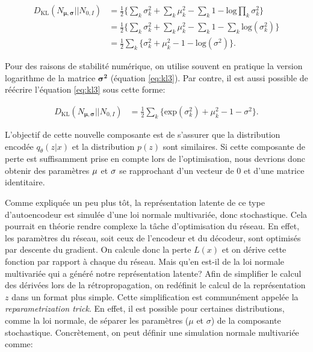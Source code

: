 \begin{equation}  \label{eq:kl3}
\begin{aligned}
D_{\text{KL}}(N_{\boldsymbol \mu, \boldsymbol \sigma} || N_{0,I}) &=  \frac{1}{2}\Big\{\sum_k \sigma_{k}^2+ \sum_{k}\mu_{k}^2 - \sum_{k} 1 - \text{log} \prod_{k}\sigma_{k}^2\Big \} \\
&=\frac{1}{2}\Big\{\sum_k \sigma_{k}^2+ \sum_{k}\mu_{k}^2 - \sum_{k} 1 - \sum_{k} \text{log} (\sigma_{k}^2)\Big \} \\
&=\frac{1}{2} \sum_{k}\Big\{\sigma_{k}^2 + \mu_{k}^2 - 1 - \text{log}(\sigma^2)\Big\}.
\end{aligned}
\end{equation}

Pour des raisons de stabilité numérique, on utilise souvent en pratique la version logarithme de la matrice $\boldsymbol{\sigma^2}$ (équation \ref{eq:kl3}). Par contre, il est aussi possible de réécrire l'équation \ref{eq:kl3} sous cette forme:

\begin{equation}  \label{eq:kl4}
\begin{aligned}
D_{\text{KL}}(N_{\boldsymbol \mu, \boldsymbol \sigma} || N_{0,I}) &= \frac{1}{2} \sum_{k}\Big\{\text{exp}(\sigma_{k}^2) + \mu_{k}^2 - 1 - \sigma^2\Big\}.
\end{aligned}
\end{equation}


 L'objectif de cette nouvelle composante est de s'assurer que la distribution encodée $q_{\theta}(z|x)$ et la distribution \DIFdelbegin {}\DIFdelend \DIFaddbegin \textit{} \DIFaddend $p(z)$ sont similaires. Si cette composante de perte est suffisamment prise en compte lors de l'optimisation, nous devrions donc obtenir des paramètres $\boldmath \mu$ et $\boldmath \sigma$ se rapprochant d'un vecteur de 0 et d'une matrice identitaire. 
\DIFdelbegin {}\DIFdelend 

Comme expliquée un peu plus tôt, la représentation latente de ce type d'autoencodeur est simulée d'une loi normale multivariée, donc stochastique. Cela pourrait en théorie rendre complexe la tâche d'optimisation du réseau. En effet, les paramètres du réseau, soit ceux de l'encodeur et du décodeur, sont optimisés par descente du gradient. On calcule donc la perte $L(x)$ et on dérive cette fonction par rapport à chaque \DIFdelbegin {}\DIFdelend \DIFaddbegin {}\DIFaddend du réseau. Mais qu'en est-il de la loi normale multivariée qui a généré notre représentation latente? Afin de simplifier le calcul des dérivées lors de la rétropropagation, on redéfinit le calcul de la représentation $z$ dans un format plus simple. Cette simplification est communément appelée la  \textit{reparametrization trick}. En effet, il est possible pour certaines distributions, comme la loi normale, de séparer les paramètres ($\mu$ et $\sigma$)  de la composante stochastique. Concrètement, on peut définir une simulation normale multivariée comme:

